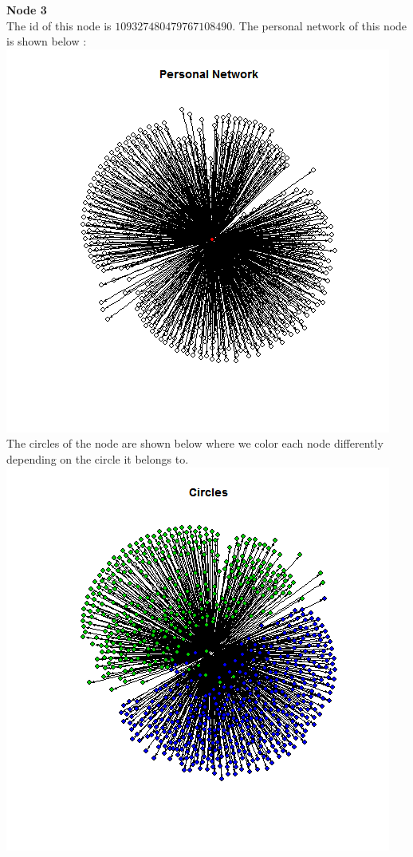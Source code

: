 \documentclass{article}
\begin{document}
\textbf{Node 3 }\\
The id of this node is $109327480479767108490$.
The personal network of this node is shown below :\\
\includegraphics[scale=0.6]{7a} \\
The circles of the node are shown below where we color each node differently
depending on the circle it belongs to.\\
\includegraphics[scale=0.6]{7d} \\
\end{document}
